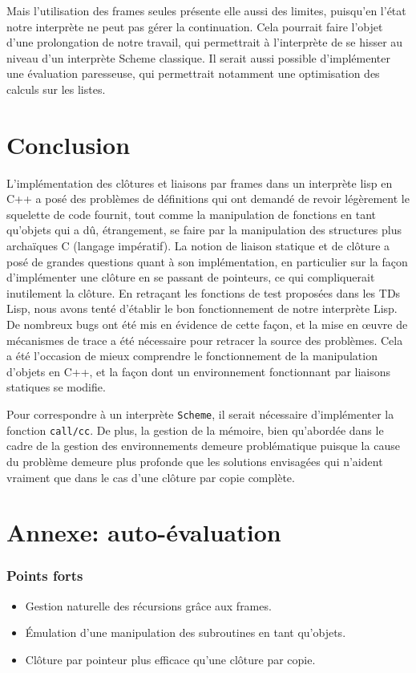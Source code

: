 \documentclass[a4paper,11pt]{article}
\begin{document}
Mais l'utilisation des frames seules présente elle aussi des limites, puisqu'en l'état 
notre interprète ne peut pas gérer la continuation. Cela pourrait faire l'objet d'une 
prolongation de notre travail, qui permettrait à l'interprète de se hisser au niveau 
d'un interprète Scheme classique. Il serait aussi possible d'implémenter une évaluation 
paresseuse, qui permettrait notamment une optimisation des calculs sur les listes.

\section*{Conclusion}

L'implémentation des clôtures et liaisons par frames dans un interprète lisp en
C++ a posé des problèmes de définitions qui ont demandé de revoir légèrement le
squelette de code fournit, tout comme la manipulation de fonctions en tant
qu'objets qui a dû, étrangement, se faire par la manipulation des structures
plus archaïques C (langage impératif). La notion de liaison statique et de clôture a posé de
grandes questions quant à son implémentation, en particulier sur la façon
d'implémenter une clôture en se passant de pointeurs, ce qui compliquerait
inutilement la clôture.
En retraçant les fonctions de test proposées dans les TDs Lisp, nous avons tenté
d'établir le bon fonctionnement de notre interprète Lisp. De nombreux bugs ont
été mis en évidence de cette façon, et la mise en œuvre de mécanismes de trace
a été nécessaire pour retracer la source des problèmes. Cela a été l'occasion
de mieux comprendre le fonctionnement de la manipulation d'objets en C++, et la
façon dont un environnement fonctionnant par liaisons statiques se modifie.

Pour correspondre à un interprète \texttt{Scheme}, il serait nécessaire
d'implémenter la fonction \texttt{call/cc}. De plus, la gestion de la mémoire,
bien qu'abordée dans le cadre de la gestion des environnements demeure problématique 
puisque la cause du problème demeure plus profonde que les solutions
envisagées qui n'aident vraiment que dans le cas d'une clôture par copie complète.

\section*{Annexe: auto-évaluation}

\subsubsection*{Points forts}
\begin{itemize}
\item Gestion naturelle des récursions grâce aux frames.
\item Émulation d'une manipulation des subroutines en tant qu'objets.
\item Clôture par pointeur plus efficace qu'une clôture par copie.
\end{itemize}
\end{document}
